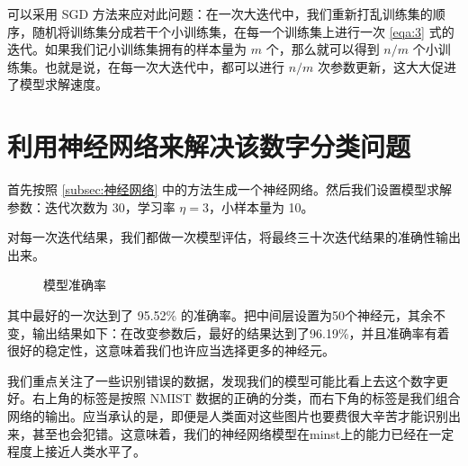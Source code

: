 \documentclass{ctexart}
\numberwithin{equation}{section}    %
\begin{document}
可以采用 SGD 方法来应对此问题：在一次大迭代中，我们重新打乱训练集的顺序，随机将训练集分成若干个小训练集，在每一个训练集上进行一次 \eqref{eqa:3} 式的迭代。如果我们记小训练集拥有的样本量为 $m$ 个，那么就可以得到 $n/m$ 个小训练集。也就是说，在每一次大迭代中，都可以进行 $n/m$ 次参数更新，这大大促进了模型求解速度。
\section{利用神经网络来解决该数字分类问题}
首先按照 \ref{subsec:神经网络} 中的方法生成一个神经网络。然后我们设置模型求解参数：迭代次数为 30，学习率 $\eta=3$，小样本量为 10。

对每一次迭代结果，我们都做一次模型评估，将最终三十次迭代结果的准确性输出出来。

\begin{figure}[htbp]%
    \centering
    \hfill
    \caption{模型准确率}
    \label{3figs}
\end{figure}



其中最好的一次达到了 95.52\% 的准确率。把中间层设置为50个神经元，其余不变，输出结果如下：在改变参数后，最好的结果达到了96.19\%，并且准确率有着很好的稳定性，这意味着我们也许应当选择更多的神经元。

我们重点关注了一些识别错误的数据，发现我们的模型可能比看上去这个数字更好。右上角的标签是按照 NMIST 数据的正确的分类，⽽右下角的标签是我们组合⽹络的输出。应当承认的是，即便是人类面对这些图片也要费很大辛苦才能识别出来，甚至也会犯错。这意味着，我们的神经网络模型在minst上的能力已经在一定程度上接近人类水平了。
\end{document}
